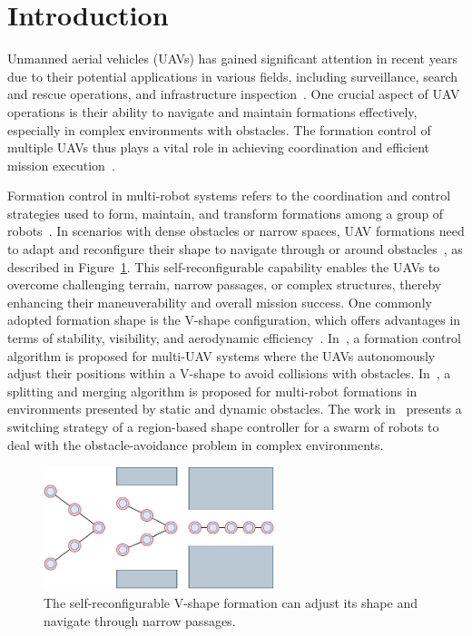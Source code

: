 \section{Introduction}
Unmanned aerial vehicles (UAVs) has gained significant attention in recent years due to their potential applications in various fields, including surveillance, search and rescue operations, and infrastructure inspection~\cite{8682048,9990164}. One crucial aspect of UAV operations is their ability to navigate and maintain formations effectively, especially in complex environments with obstacles. The formation control of multiple UAVs thus plays a vital role in achieving coordination and efficient mission execution~\cite{Anderson,9990236}.

Formation control in multi-robot systems refers to the coordination and control strategies used to form, maintain, and transform formations among a group of robots~\cite{736776,Balch2000}. In scenarios with dense obstacles or narrow spaces, UAV formations need to adapt and reconfigure their shape to navigate through or around obstacles~\cite{7487747,Dang2019,8843165}, as described in Figure~\ref{fig:idea}. This self-reconfigurable capability enables the UAVs to overcome challenging terrain, narrow passages, or complex structures, thereby enhancing their maneuverability and overall mission success. One commonly adopted formation shape is the V-shape configuration, which offers advantages in terms of stability, visibility, and aerodynamic efficiency~\cite{Dang2019,Mirzaeinia2019}. In~\cite{Dang2019}, a formation control algorithm is proposed for multi-UAV systems where the UAVs autonomously adjust their positions within a V-shape to avoid collisions with obstacles. In~\cite{8793765}, a splitting and merging algorithm is proposed for multi-robot formations in environments presented by static and dynamic obstacles. The work in~\cite{8594438} presents a switching strategy of a region-based shape controller for a swarm of robots to deal with the obstacle-avoidance problem in complex environments. 

\begin{figure}
    \centering
    \includegraphics[width=0.6\textwidth]{paper1/images/idea.pdf}
    \caption{The self-reconfigurable V-shape formation can adjust its shape and navigate through narrow passages.}
    \label{fig:idea}
\end{figure}

